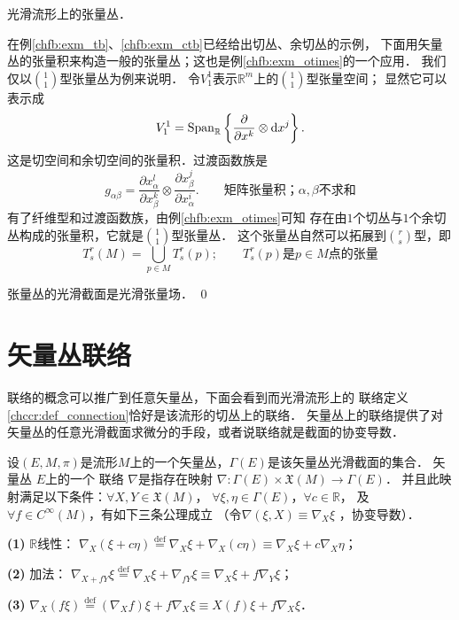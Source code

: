 \begin{example}\label{chfb:exm_tensor-bundles}
    光滑流形上的张量丛．
\end{example}
在例\ref{chfb:exm_tb}、\ref{chfb:exm_ctb}已经给出切丛、余切丛的示例，
下面用矢量丛的张量积来构造一般的张量丛；这也是例\ref{chfb:exm_otimes}的一个应用．
我们仅以$\binom{1}{1}$型张量丛为例来说明．
令$V^1_1$表示$\mathbb{R}^m$上的$\binom{1}{1}$型张量空间；
显然它可以表示成
\begin{equation*}
    V^1_1 = {\rm Span}_{\mathbb{R}}\left\{  \frac{\partial}{\partial x^k}\otimes {\rm d}x^j \right\} .
\end{equation*}
这是切空间和余切空间的张量积．过渡函数族是
\begin{equation*}
    g_{\alpha\beta} = \frac{\partial {x}^l_\alpha}{\partial {x}^k_\beta} \otimes
    \frac{\partial {x}^j_\beta}{\partial {x}^i_\alpha}  .
    \qquad \text{矩阵张量积；}\alpha,\beta \text{不求和}
\end{equation*}
有了纤维型和过渡函数族，由例\ref{chfb:exm_otimes}可知
存在由$1$个切丛与$1$个余切丛构成的张量积，它就是$\binom{1}{1}$型张量丛．
这个张量丛自然可以拓展到$\binom{r}{s}$型，即
\begin{equation*}
    T_s^r(M)=\bigcup_{p \in M} T_s^r(p); \qquad
    T_s^r(p)\text{是}p\in M\text{点的张量}
\end{equation*}


张量丛的光滑截面是光滑张量场．
\qed








\section{矢量丛联络}\label{chfb:sec_connection}

联络的概念可以推广到任意矢量丛，下面会看到而光滑流形上的
联络定义\ref{chccr:def_connection}恰好是该流形的切丛上的联络．
矢量丛上的联络提供了对矢量丛的任意光滑截面求微分的手段，或者说联络就是截面的协变导数．


\begin{definition}\label{chfb:def_vb-connection}
    设$(E,M,\pi)$是流形$M$上的一个矢量丛，$\Gamma(E)$是该矢量丛光滑截面的集合．
    矢量丛 $E$上的一个 {\heiti 联络} $\nabla$是指存在映射
    $\nabla: \Gamma(E) \times \mathfrak{X}(M) \rightarrow \Gamma(E)$．
    并且此映射满足以下条件：$\forall X, Y \in \mathfrak{X}(M)$，
    $\forall \xi, \eta \in \Gamma(E)$，$\forall c \in \mathbb{R}$，
    及 $\forall f \in C^{\infty}(M)$，有如下三条公理成立
    （令$\nabla(\xi,X)\equiv \nabla_X \xi$ ，{\heiti 协变导数}）．
    
    {\bfseries (1)} $\mathbb{R}$线性： $\nabla_X(\xi+c \eta) \overset{\mathrm {def}}{=}
     \nabla_X \xi+\nabla_X (c\eta) \equiv  \nabla_X \xi+c \nabla_X \eta$；
    
    {\bfseries (2)} 加法： $\nabla_{X+f Y} \xi \overset{\mathrm {def}}{=} 
    \nabla_X \xi+ \nabla_{fY} \xi \equiv \nabla_X \xi+f \nabla_Y \xi$；
    
    {\bfseries (3)} $\nabla_X(f \xi) \overset{\mathrm {def}}{=} (\nabla_X f) \xi+f \nabla_X \xi
     \equiv X(f) \xi+f \nabla_X \xi$．
\end{definition}


